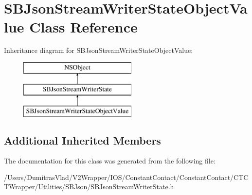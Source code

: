 \hypertarget{interface_s_b_json_stream_writer_state_object_value}{\section{S\-B\-Json\-Stream\-Writer\-State\-Object\-Value Class Reference}
\label{interface_s_b_json_stream_writer_state_object_value}
}
Inheritance diagram for S\-B\-Json\-Stream\-Writer\-State\-Object\-Value\-:\begin{figure}[H]
\begin{center}
\leavevmode
\includegraphics[height=3.000000cm]{interface_s_b_json_stream_writer_state_object_value}
\end{center}
\end{figure}
\subsection*{Additional Inherited Members}


The documentation for this class was generated from the following file\-:\begin{DoxyCompactItemize}
\item 
/\-Users/\-Dumitras\-Vlad/\-V2\-Wrapper/\-I\-O\-S/\-Constant\-Contact/\-Constant\-Contact/\-C\-T\-C\-T\-Wrapper/\-Utilities/\-S\-B\-Json/S\-B\-Json\-Stream\-Writer\-State.\-h\end{DoxyCompactItemize}
